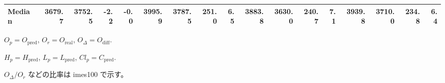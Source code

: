 \begin{threeparttable}
{\begin{tabular}{lrrrrrrrrrrrrrrrr}
 Median & 3679.7 & 3752.5 &       -2.2 &           -0.0 & 3995.9 & 3787.5 &      251.0 &            6.5 & 3883.8 & 3630.0 &      240.7 &            7.1 & 3939.8 & 3710.0 &       234.8 &              6.4 \\
\bottomrule
\end{tabular}
}
\begin{tablenotes}\footnotesize
\item $O_p=O_{\text{pred}}$, $O_r=O_{\text{real}}$, $O_\Delta=O_{\text{diff}}$.
\item $H_p=H_{\text{pred}}$, $L_p=L_{\text{pred}}$, $Cl_p=C_{\text{pred}}$.
\item $O_\Delta/O_r$ などの比率は 	imes100 で示す。
\end{tablenotes}
\end{threeparttable}
\endgroup
